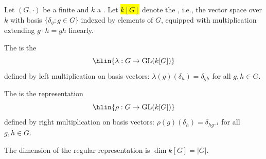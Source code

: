 \begin{definition} \label{definition:regular_representation_of_a_finite_group_over_a_field}

    Let $(G, \cdot)$ be a finite  and $k$ a . Let \hl{$k[G]$} denote the , i.e., the vector space over $k$ with basis $\{\delta_g : g \in G\}$ indexed by elements of $G$, equipped with multiplication extending $g \cdot h = gh$ linearly.

    The  is the 
    $$\hlin{\lambda : G \to \mathrm{GL}(k[G])}$$
    defined by left multiplication on basis vectors: $\lambda(g)(\delta_h) = \delta_{gh}$ for all $g, h \in G$.

    The  is the representation
    $$\hlin{\rho : G \to \mathrm{GL}(k[G])}$$
    defined by right multiplication on basis vectors: $\rho(g)(\delta_h) = \delta_{hg^{-1}}$ for all $g, h \in G$.

    The dimension of the regular representation is $\dim k[G] = |G|$.
\end{definition}
